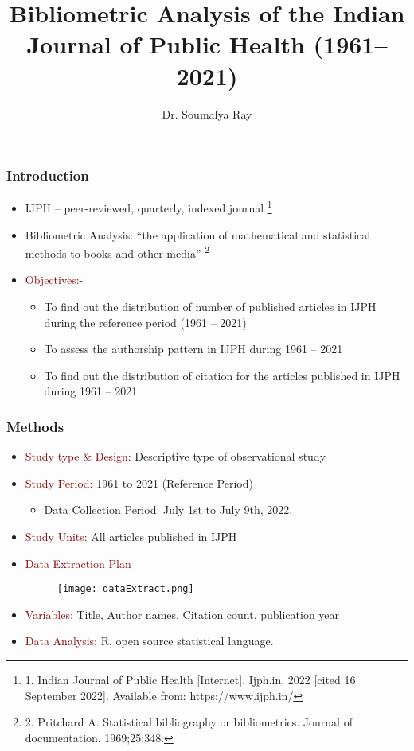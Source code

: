 \documentclass[14pt, aspectratio=169]{beamer}
\title[Bibliometric Analysis IJPH]{Bibliometric Analysis of the Indian Journal of Public Health (1961–2021) }
\author[Dr Soumalya Ray]{Dr. Soumalya Ray}
\institute[ ]{  Assistant Professor \\
Department of Community Medicine \\
College of Medicine and Sagore Dutta Hospital \\
Kamarhati, Kolkata - 700058}
\date{}
\begin{document}
\maketitle

\begin{frame}
\frametitle{Introduction}
\begin{itemize}
  \item IJPH – peer-reviewed, quarterly, indexed journal \footnote{1. Indian Journal of Public Health [Internet]. Ijph.in. 2022 [cited 16 September 2022]. Available from: https://www.ijph.in/}
  \item Bibliometric Analysis: “the application of mathematical and statistical methods to books and other media” \footnote{2. Pritchard A. Statistical bibliography or bibliometrics. Journal of documentation. 1969;25:348.}
  \item \textcolor{darkred}{Objectives:-} 
  \begin{itemize}
    \item To find out the distribution of number of published articles in IJPH during the reference period (1961 – 2021) 
    \item To assess the authorship pattern in IJPH during 1961 – 2021 
    \item To find out the distribution of citation for the articles published in IJPH during 1961 – 2021 
  \end{itemize}
\end{itemize}
  
\end{frame}

\begin{frame}
  \frametitle{Methods}
  \begin{itemize}
    \item \textcolor{darkred}{Study type \& Design:} Descriptive type of observational study 
    \item \textcolor{darkred}{Study Period:} 1961 to 2021 (Reference Period)
    \begin{itemize}
      \item Data Collection Period: July 1st to July 9th, 2022. 
    \end{itemize}
    \item \textcolor{darkred}{Study Units:} All articles published in IJPH
    \item \textcolor{darkred}{Data Extraction Plan}
    \begin{figure}
      \texttt{[image: dataExtract.png]}
    \end{figure}
    \item \textcolor{darkred}{Variables:} Title, Author names, Citation count, publication year
    \item \textcolor{darkred}{Data Analysis:} R, open source statistical language.  
  \end{itemize}
\end{frame}
\end{document}

